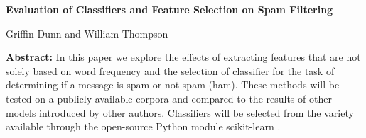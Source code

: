 \documentclass[12pt]{article}
\begin{document}
    \begin{center}
        \textbf{Evaluation of Classifiers and Feature Selection on Spam Filtering} 
    \end{center}

    \begin{center}
        Griffin Dunn and William Thompson
    \end{center}

    \textbf{Abstract:} 
        In this paper we explore the effects of extracting features that are not 
        solely based on word frequency and the selection of classifier for the task
        of determining if a message is spam or not spam (ham). These methods
        will be tested on a publicly available corpora and compared to the results
        of other models introduced by other authors. Classifiers will be selected
        from the variety available through the open-source Python module scikit-learn \cite{scikit-learn}.
\end{document}
